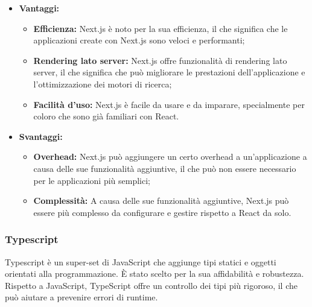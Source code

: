 \documentclass[10pt, a4paper]{article}
\begin{document}
\begin{itemize}
\item \textbf{Vantaggi:}
\begin{itemize}
\item \textbf{Efficienza:} Next.js è noto per la sua efficienza, il che significa che le applicazioni create con Next.js sono veloci e performanti;
\item \textbf{Rendering lato server:} Next.js offre funzionalità di rendering lato server, il che significa che può migliorare le prestazioni dell'applicazione e l'ottimizzazione dei motori di ricerca;
\item \textbf{Facilità d'uso:} Next.js è facile da usare e da imparare, specialmente per coloro che sono già familiari con React.
\end{itemize}
\item \textbf{Svantaggi:}
\begin{itemize}
\item \textbf{Overhead:} Next.js può aggiungere un certo overhead a un'applicazione a causa delle sue funzionalità aggiuntive, il che può non essere necessario per le applicazioni più semplici;
\item \textbf{Complessità:} A causa delle sue funzionalità aggiuntive, Next.js può essere più complesso da configurare e gestire rispetto a React da solo.
\end{itemize}
\end{itemize}

\subsubsection{Typescript}
Typescript è un super-set di JavaScript che aggiunge tipi statici e oggetti orientati alla programmazione. È stato scelto per la sua affidabilità e robustezza. Rispetto a JavaScript, TypeScript offre un controllo dei tipi più rigoroso, il che può aiutare a prevenire errori di runtime.
\end{document}
